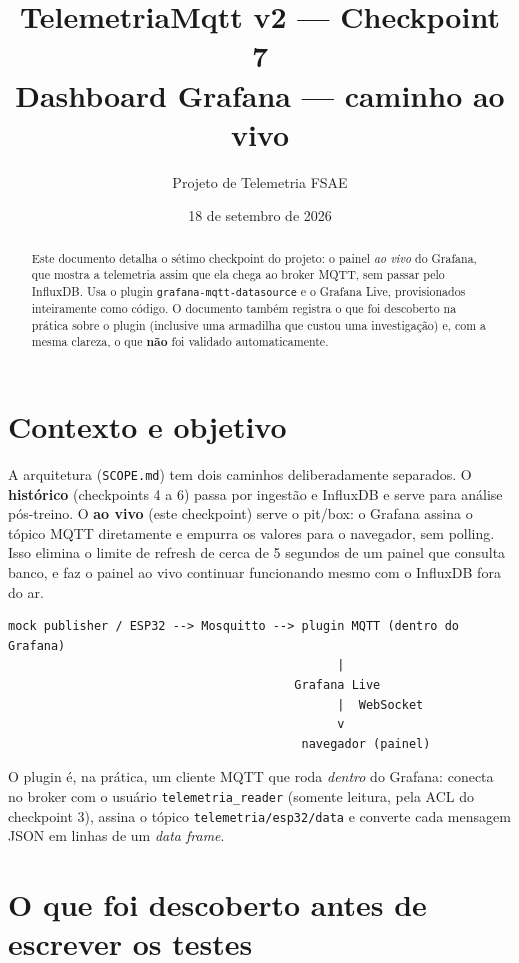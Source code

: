 \documentclass[11pt,a4paper]{article}
\title{\textbf{TelemetriaMqtt v2 --- Checkpoint 7} \\[4pt]
\large Dashboard Grafana --- caminho ao vivo}
\author{Projeto de Telemetria FSAE}
\date{18 de setembro de 2026}
\begin{document}
\maketitle

\begin{abstract}
\noindent Este documento detalha o sétimo checkpoint do projeto: o painel \emph{ao vivo} do Grafana, que mostra a telemetria assim que ela chega ao broker MQTT, sem passar pelo InfluxDB. Usa o plugin \texttt{grafana-mqtt-datasource} e o Grafana Live, provisionados inteiramente como código. O documento também registra o que foi descoberto na prática sobre o plugin (inclusive uma armadilha que custou uma investigação) e, com a mesma clareza, o que \textbf{não} foi validado automaticamente.
\end{abstract}

\tableofcontents

\section{Contexto e objetivo}

A arquitetura (\texttt{SCOPE.md}) tem dois caminhos deliberadamente separados. O \textbf{histórico} (checkpoints 4 a 6) passa por ingestão e InfluxDB e serve para análise pós-treino. O \textbf{ao vivo} (este checkpoint) serve o pit/box: o Grafana assina o tópico MQTT diretamente e empurra os valores para o navegador, sem polling. Isso elimina o limite de refresh de cerca de 5 segundos de um painel que consulta banco, e faz o painel ao vivo continuar funcionando mesmo com o InfluxDB fora do ar.

\begin{lstlisting}[caption={Caminho ao vivo (trecho da arquitetura)}]
mock publisher / ESP32 --> Mosquitto --> plugin MQTT (dentro do Grafana)
                                              |
                                        Grafana Live
                                              |  WebSocket
                                              v
                                         navegador (painel)
\end{lstlisting}

O plugin é, na prática, um cliente MQTT que roda \emph{dentro} do Grafana: conecta no broker com o usuário \texttt{telemetria\_reader} (somente leitura, pela ACL do checkpoint 3), assina o tópico \texttt{telemetria/esp32/data} e converte cada mensagem JSON em linhas de um \emph{data frame}.

\section{O que foi descoberto antes de escrever os testes}
\end{document}
